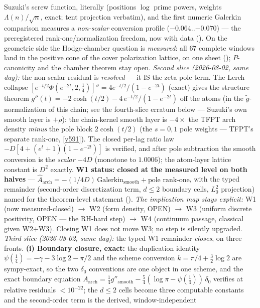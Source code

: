 \documentclass[11pt,a4paper]{article}
\begin{document}
Suzuki's screw function, literally (positions $\log$ prime powers,
weights $\Lambda(n)/\sqrt n$, exact; tent projection verbatim), and
the first numeric Galerkin comparison measures a \emph{non-scalar}
conversion profile ($-0.064..{-0.070}$) --- the preregistered
rank-one/normalization freedom, now with data
().  On the geometric side the
Hodge-chamber question is \emph{measured}: all $67$ complete windows
land in the positive cone of the cover polarization lattice, on one
sheet (); $P$-canonicity and the chamber
theorem stay open.
\emph{Second slice (2026-08-02, same day):} the non-scalar residual is
\emph{resolved} --- it IS the zeta pole term.  The Lerch collapse
$[e^{-t/2}\Phi(e^{-2t},2,\tfrac14)]''=4e^{-t/2}/(1-e^{-2t})$ (exact)
gives the structure theorem $g''(t)=-2\cosh(t/2)-4\,e^{-t/2}/(1-e^{-2t})$
off the atoms (in the $\tilde g$-normalization of this chain; see the
fourth-slice erratum below --- Suzuki's own smooth layer is $+\rho$):
the chain-kernel smooth layer is $-4\times$ the TFPT arch
density \emph{minus} the pole block $2\cosh(t/2)$ (the $s=0,1$ pole
weights --- TFPT's separate rank-one, \vref{v591}).  The closed
per-lag ratio law $-D[4+(e^t{+}1)(1-e^{-2t})]$ is verified, and after
pole subtraction the smooth conversion is the \emph{scalar} $-4D$
(monotone to $1.0006$); the atom-layer lattice constant is $D^2$
exactly.  \textbf{W1 status: closed at the measured level on both
halves} --- $\widehat A_{\mathrm{arch}} = -(1/4D)\,
\mathrm{Galerkin}_{\mathrm{smooth}} + \text{pole rank-one}$, with the
typed remainder (second-order discretization term, $d\le2$ boundary
cells, $L^2_0$ projection) named for the theorem-level statement
().  \emph{The implication map stays
explicit:} W1 (now measured-closed) $\to$ W2 (form density, OPEN) $\to$
W3 (uniform discrete positivity, OPEN --- the RH-hard step) $\to$ W4
(continuum passage, classical given W2+W3).  Closing W1 does not move
W3; no step is silently upgraded.
\emph{Third slice (2026-08-02, same day):} the typed W1 remainder
\emph{closes}, on three fronts.  \textbf{(i) Boundary closure, exact:}
the duplication identity $\psi(\tfrac14)=-\gamma-3\log2-\pi/2$ and the
scheme conversion $k=\pi/4+\tfrac32\log2$ are sympy-exact, so the two
$\delta_0$ conventions are one object in one scheme, and the exact
boundary equation $A_{\mathrm{arch}}=\tfrac14 g''_{\mathrm{smooth}}
-\tfrac54(\log\pi-\psi(\tfrac14))\,\delta_0$ verifies at relative
residuals $<10^{-22}$; the $d\le2$ cells become three computable
constants and the second-order term is the derived, window-independent
\end{document}
